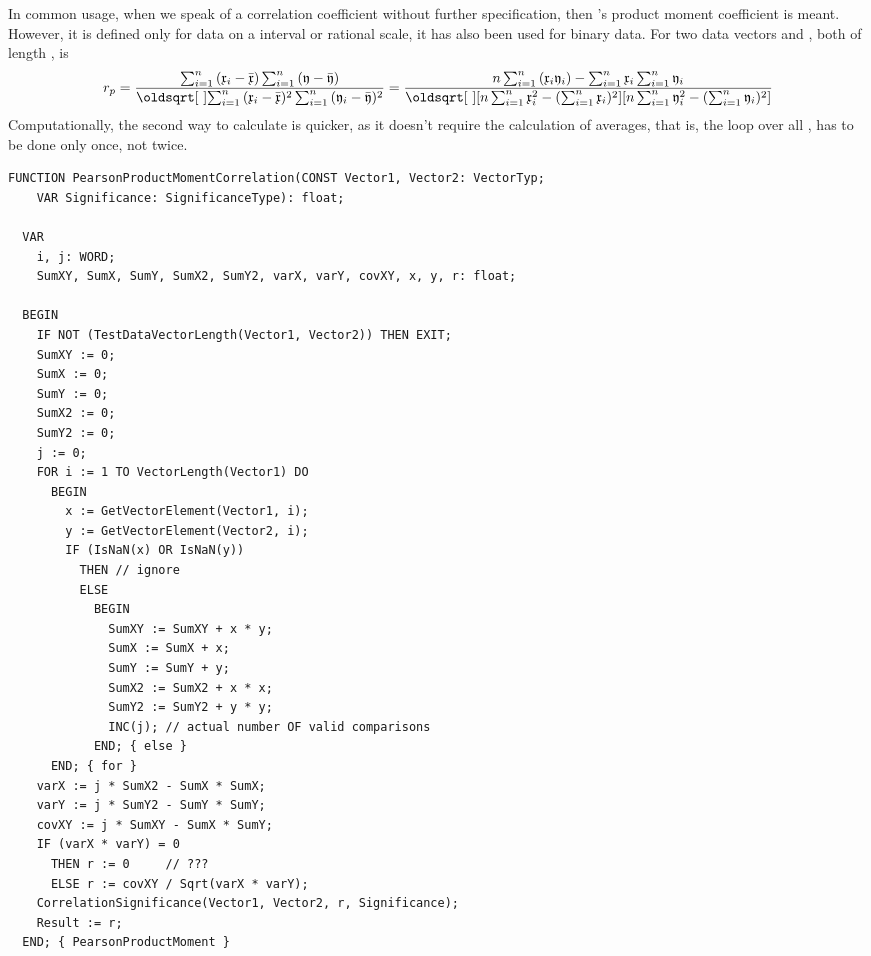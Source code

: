 \begin{refsection}
In common usage, when we speak of a correlation coefficient without further specification, then 's product moment coefficient  \parencite{Pea-95} is meant. However, it is defined only for data on a interval or rational scale, it has also been used for binary data. For two data vectors  and , both of length ,  is
\begin{equation}
  r_p = \frac{\sum_{i=1}^n{(\AbsVec{x}_i - \bar{\AbsVec{x}}) \sum_{i=1}^n{(\AbsVec{y} - \bar{\AbsVec{y}})}}}{\sqrt{\sum_{i=1}^n{(\AbsVec{x}_i - \bar{\AbsVec{x}})^2 \sum_{i=1}^n{(\AbsVec{y}_i - \bar{\AbsVec{y}})^2}}}} = \frac{n \sum_{i=1}^n{(\AbsVec{x}_i \AbsVec{y}_i)} - \sum_{i=1}^n{\AbsVec{x}_i} \sum_{i=1}^n{\AbsVec{y}_i}}{\sqrt{[n \sum_{i=1}^n{\AbsVec{x}_i^2} - (\sum_{i=1}^n{\AbsVec{x}_i})^2] [n \sum_{i=1}^n{\AbsVec{y}_i^2} - (\sum_{i=1}^n{\AbsVec{y}_i})^2]}}
\end{equation}
Computationally, the second way to calculate  is quicker, as it doesn't require the calculation of averages, that is, the loop over all ,  has to be done only once, not twice.

\begin{lstlisting}[caption= \Name{Pearson} product moment correlation]
  FUNCTION PearsonProductMomentCorrelation(CONST Vector1, Vector2: VectorTyp;
    VAR Significance: SignificanceType): float;

  VAR
    i, j: WORD;
    SumXY, SumX, SumY, SumX2, SumY2, varX, varY, covXY, x, y, r: float;

  BEGIN
    IF NOT (TestDataVectorLength(Vector1, Vector2)) THEN EXIT;
    SumXY := 0;
    SumX := 0;
    SumY := 0;
    SumX2 := 0;
    SumY2 := 0;
    j := 0;
    FOR i := 1 TO VectorLength(Vector1) DO
      BEGIN
        x := GetVectorElement(Vector1, i);
        y := GetVectorElement(Vector2, i);
        IF (IsNaN(x) OR IsNaN(y))
          THEN // ignore
          ELSE
            BEGIN
              SumXY := SumXY + x * y;
              SumX := SumX + x;
              SumY := SumY + y;
              SumX2 := SumX2 + x * x;
              SumY2 := SumY2 + y * y;
              INC(j); // actual number OF valid comparisons
            END; { else }
      END; { for }
    varX := j * SumX2 - SumX * SumX;
    varY := j * SumY2 - SumY * SumY;
    covXY := j * SumXY - SumX * SumY;
    IF (varX * varY) = 0
      THEN r := 0     // ???
      ELSE r := covXY / Sqrt(varX * varY);
    CorrelationSignificance(Vector1, Vector2, r, Significance);
    Result := r;
  END; { PearsonProductMoment }
\end{lstlisting}


\end{refsection}
